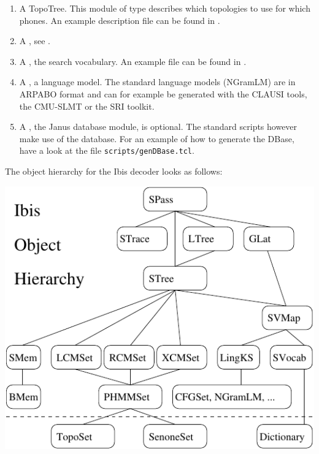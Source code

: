 \begin{enumerate}
\item A TopoTree.   This module of type   describes
which topologies to use for  which phones. An example description file
can be found in .

\item A , see .

\item A , the search vocabulary. An example
file can be found in .

\item A , a language model. The standard language
models (NGramLM) are in ARPABO format and can for example be generated
with the CLAUSI tools, the CMU-SLMT or the SRI toolkit.

\item A    ,    the Janus   database    module, is
optional. The standard scripts however  make use of the database.  For
an  example of how to   generate the DBase,  have  a look  at the file
\texttt{scripts/genDBase.tcl}.

\end{enumerate}

The object hierarchy for the Ibis decoder looks as follows:\\

\ifpdf
  \centerline{\includegraphics{hier}}
\else
  \centerline{}
\fi


